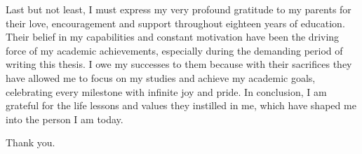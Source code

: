 Last but not least, I must express my very profound gratitude to my parents for their love, encouragement and support throughout eighteen years of education. 
Their belief in my capabilities and constant motivation have been the driving force of my academic achievements, especially during the demanding period of writing this thesis.
I owe my successes to them because with their sacrifices they have allowed me to focus on my studies and achieve my academic goals, celebrating every milestone with infinite joy and pride.
In conclusion, I am grateful for the life lessons and values they instilled in me, which have shaped me into the person I am today.

Thank you.